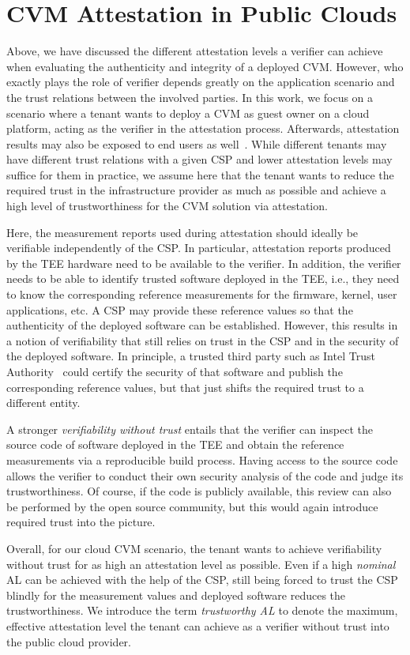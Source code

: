 \section{CVM Attestation in Public Clouds}
\label{sec:scenario}

Above, we have discussed the different attestation levels a verifier can achieve
when evaluating the authenticity and integrity of a deployed \ac{CVM}.  However,
who exactly plays the role of verifier depends greatly on the application
scenario and the trust relations between the involved parties.  In this work, we
focus on a scenario where a tenant wants to deploy a \ac{CVM} as guest owner on
a cloud platform, acting as the verifier in the attestation process. Afterwards,
attestation results may also be exposed to end users as
well~\cite{galanou2023revelio}. While different tenants may have different trust
relations with a given \ac{CSP} and lower attestation levels may suffice for
them in practice, we assume here that the tenant wants to reduce the required
trust in the infrastructure provider as much as possible and achieve a high
level of trustworthiness for the \ac{CVM} solution via attestation. 

Here, the measurement reports used during attestation should ideally be
verifiable independently of the \ac{CSP}. In particular, attestation reports
produced by the \ac{TEE} hardware need to be available to the verifier. In
addition, the verifier needs to be able to identify trusted software deployed in
the \ac{TEE}, i.e., they need to know the corresponding reference measurements
for the firmware, kernel, user applications, etc. A \ac{CSP} may provide these
reference values so that the authenticity of the deployed software can be
established. However, this results in a notion of verifiability that still
relies on trust in the \ac{CSP} and in the security of the deployed software. In
principle, a trusted third party such as Intel Trust
Authority~\cite{intelTrustAuthority} could certify the security of that software
and publish the corresponding reference values, but that just shifts the
required trust to a different entity.

A stronger \emph{verifiability without trust} entails that the verifier can
inspect the source code of software deployed in the \ac{TEE} and obtain the
reference measurements via a reproducible build process. Having access to the
source code allows the verifier to conduct their own security analysis of the
code and judge its trustworthiness. Of course, if the code is publicly
available, this review can also be performed by the open source community, but
this would again introduce required trust into the picture.

Overall, for our cloud \ac{CVM} scenario, the tenant wants to achieve
verifiability without trust for as high an attestation level as possible. Even
if a high \emph{nominal} AL can be achieved with the help of the \ac{CSP}, still
being
forced to trust the \ac{CSP} blindly for the measurement values and deployed
software reduces the trustworthiness. We introduce the term \emph{trustworthy
AL} to denote the maximum, effective attestation level the tenant can achieve as
a verifier without trust into the public cloud provider.